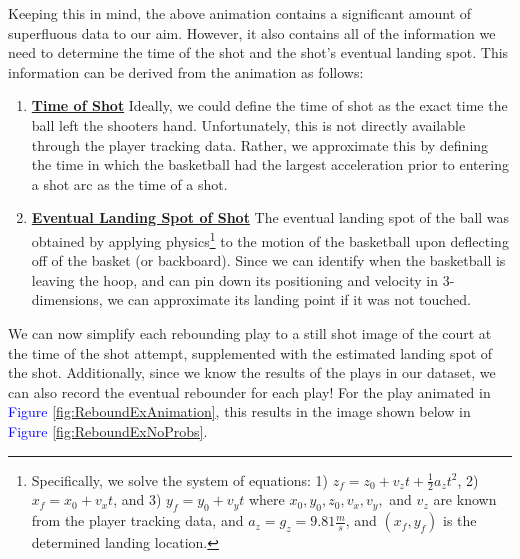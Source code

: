 \documentclass{article}
\begin{document}
\bigbreak
\noindent
Keeping this in mind, the above animation contains a significant amount of superfluous data to our aim. However, it also contains all of the information we need to determine the time of the shot and the shot's eventual landing spot. This information can be derived from the animation as follows:
\begin{enumerate}
	\item{\underline{{\bf Time of Shot}}}
	\newline
         \noindent
	 Ideally, we could define the time of shot as the exact time the ball left the shooters hand. Unfortunately, this is not directly available through the player tracking data. Rather, we approximate this by defining the time in which the basketball had the largest acceleration prior to entering a shot arc as the time of a shot.
	\item{\underline{{\bf Eventual Landing Spot of Shot}}}
	\newline
         \noindent
         The eventual landing spot of the ball was obtained by applying physics\footnote{Specifically, we solve the system of equations: 1) $z_f = z_0 + v_zt + \frac{1}{2}a_zt^2 $, 2) $x_f = x_0 + v_xt $, and 3) $y_f = y_0 + v_yt $ where $x_0, y_0, z_0, v_x, v_y, $ and $v_z$ are known from the player tracking data, and $a_z = g_z = 9.81 \frac{m}{s} $, and $(x_f, y_f)$ is the determined landing location.} to the motion of the basketball upon deflecting off of the basket (or backboard). Since we can identify when the basketball is leaving the hoop, and can pin down its positioning and velocity in 3-dimensions, we can approximate its landing point if it was not touched.
\end{enumerate}	

\bigbreak
\noindent
We can now simplify each rebounding play to a still shot image of the court at the time of the shot attempt, supplemented with  the estimated landing spot of the shot. Additionally, since we know the results of the plays in our dataset, we can also record the eventual rebounder for each play! For the play animated in \textcolor{blue}{Figure} \ref{fig:ReboundExAnimation}, this results in the image shown below in \textcolor{blue}{Figure} \ref{fig:ReboundExNoProbs}.
\end{document}
